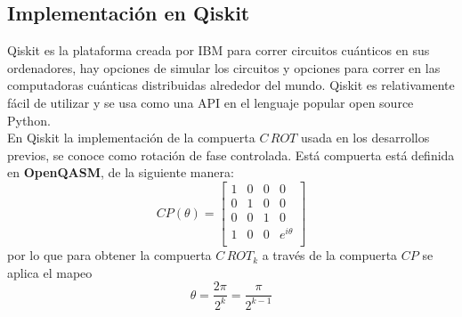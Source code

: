 \documentclass[a4paper]{article}
\begin{document}
\subsection{Implementación en Qiskit}
Qiskit es la plataforma creada por IBM para correr circuitos cuánticos en sus ordenadores, hay opciones de simular los circuitos y opciones para correr en las computadoras cuánticas distribuidas alrededor del mundo. Qiskit es relativamente fácil de utilizar y se usa como una API en el lenguaje popular open source Python.\\

En Qiskit la implementación de la compuerta $C\, ROT$ usada en los desarrollos previos, se conoce como rotación de fase controlada. Está compuerta está definida en \textbf{OpenQASM}, \cite{openQASM} de la siguiente manera:
\begin{equation}
CP(\theta)=
\begin{bmatrix}
1&0&0&0\\
0&1&0&0\\
0&0&1&0\\
1&0&0&e^{i\theta}\\
\end{bmatrix}
\end{equation}
por lo que para obtener la compuerta $C\, ROT_k$ a través de la compuerta $CP$ se aplica el mapeo
\begin{equation}
\theta=\frac{2\pi}{2^k}=\frac{\pi}{2^{k-1}}
\end{equation}
\end{document}
